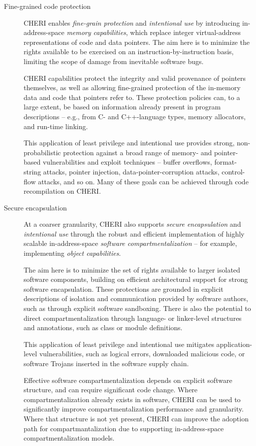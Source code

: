 \begin{description}
\item[Fine-grained code protection]
CHERI enables \textit{fine-grain protection} and \textit{intentional
use} by introducing in-address-space \textit{memory capabilities}, which
replace integer virtual-address representations of code and data pointers.
The aim here is to minimize the rights available to be exercised on an
instruction-by-instruction basis, limiting the scope of damage from inevitable
software bugs.

CHERI capabilities protect the integrity and valid provenance of pointers
themselves, as well as allowing fine-grained protection of the in-memory data
and code that pointers refer to.
These protection
%
policies
can, to a large extent, be based on information
already present in program descriptions -- e.g., from C- and C++-language types, memory
allocators, and run-time linking.

This application of least privilege and intentional use provides strong,
non-probabilistic
protection against a broad range of memory- and pointer-based vulnerabilities
and exploit techniques -- buffer overflows, format-string attacks, pointer
injection, data-pointer-corruption attacks, control-flow attacks, and so on.
Many of these goals can be achieved through code recompilation on CHERI.

\item[Secure encapsulation]
At a coarser granularity, CHERI also supports
\textit{secure encapsulation} and \textit{intentional use}
through the robust and efficient implementation of highly scalable
in-address-space \textit{software compartmentalization} -- for example,
implementing \textit{object capabilities}.

The aim here is to minimize the set of rights available to
larger isolated software components, building on efficient architectural
support for strong software encapsulation.
These protections are grounded in explicit descriptions of isolation and
communication provided by software authors, such as through explicit software
sandboxing.
There is also the potential to direct compartmentalization through
language- or linker-level structures and annotations, such as class or module
definitions.

This application of least privilege and intentional use mitigates
application-level vulnerabilities, such as logical errors,
downloaded malicious code, or software Trojans inserted in the software supply
chain.

Effective software compartmentalization depends on explicit software
structure, and can require significant code change.
Where compartmentalization already exists in software, CHERI can be used to
significantly improve compartmentalization performance and granularity.
Where that structure is not yet present, CHERI can improve the adoption path
for compartmantalization due to supporting in-address-space
compartmentalization models.
\end{description}

